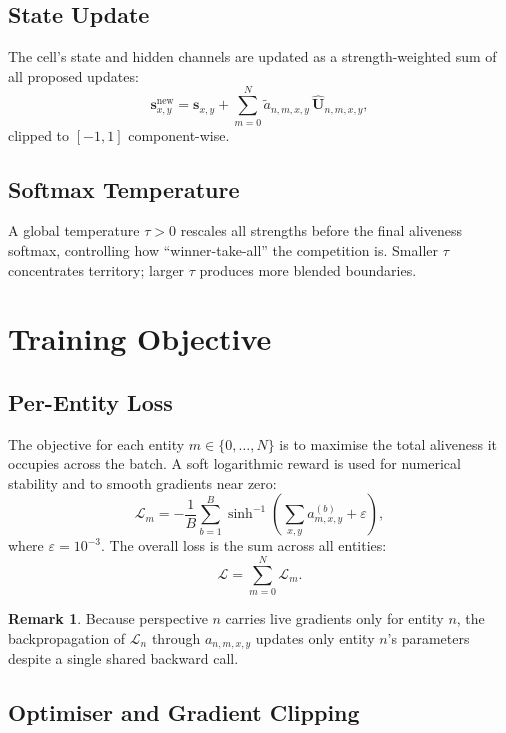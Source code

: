 \documentclass[11pt,a4paper]{article}
\theoremstyle{definition}
\newtheorem{remark}{Remark}[section]
\begin{document}
\subsection{State Update}

The cell's state and hidden channels are updated as a strength-weighted sum of all proposed updates:
\[
    \mathbf{s}_{x,y}^{\mathrm{new}} = \mathbf{s}_{x,y}
    + \sum_{m=0}^{N} \tilde{a}_{n,m,x,y}\,\hat{\mathbf{U}}_{n,m,x,y},
\]
clipped to $[-1, 1]$ component-wise.

\subsection{Softmax Temperature}

A global temperature $\tau > 0$ rescales all strengths before the final aliveness softmax, controlling how ``winner-take-all'' the competition is. Smaller $\tau$ concentrates territory; larger $\tau$ produces more blended boundaries.

\section{Training Objective}

\subsection{Per-Entity Loss}

The objective for each entity $m \in \{0,\ldots,N\}$ is to maximise the total aliveness it occupies across the batch. A soft logarithmic reward is used for numerical stability and to smooth gradients near zero:
\[
    \mathcal{L}_m = -\frac{1}{B} \sum_{b=1}^{B} \sinh^{-1}\!\left(\sum_{x,y} a_{m,x,y}^{(b)} + \varepsilon\right),
\]
where $\varepsilon = 10^{-3}$. The overall loss is the sum across all entities:
\[
    \mathcal{L} = \sum_{m=0}^{N} \mathcal{L}_m.
\]

\begin{remark}
    Because perspective $n$ carries live gradients only for entity $n$, the backpropagation of $\mathcal{L}_n$ through $a_{n,m,x,y}$ updates only entity $n$'s parameters despite a single shared backward call.
\end{remark}

\subsection{Optimiser and Gradient Clipping}
\end{document}
